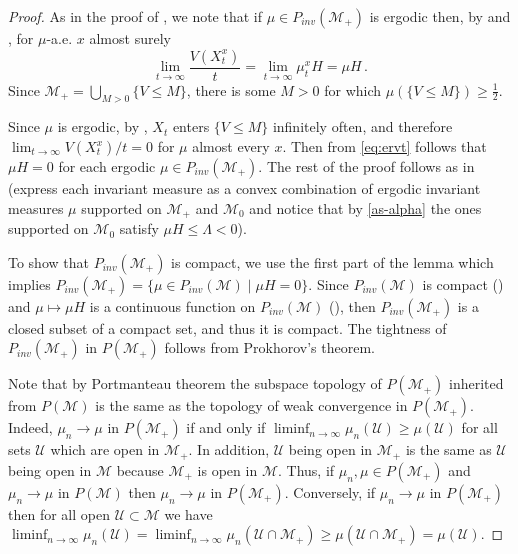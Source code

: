 \documentclass[final]{amsart}
\numberwithin{thm}{section}
\numberwithin{equation}{section}
\newcommand{\U}{\mathcal{U}}
\newcommand{\mcM}{\mathcal{M}}
\newcommand{\inv}{\mathcal{M}_+}
\begin{document}
\begin{proof}
    As in the proof of \cite[Proposition 4.6i]{persistence}, we note that if $\mu \in P_{inv}(\inv)$ is ergodic then, by  and , for $\mu$-a.e. $x$ almost surely 
    \begin{equation}\label{eq:ervt}
        \lim_{t \to \infty} \frac{V(X_t^x)}{t} = \lim_{t \to \infty} \mu_t^x H = \mu H \,.
    \end{equation}
    Since $\inv = \bigcup_{M > 0} \{V \leq M\}$, there is some $M > 0$ for which $\mu(\{V \leq M\}) \geq \frac{1}{2}$.


Since $\mu$ is ergodic,     
 by ,  $X_t$  enters $\{V \leq M\}$ infinitely often, and therefore $\lim_{t \to \infty} V(X_t^x)/t = 0$ for $\mu$ almost every $x$. Then from \eqref{eq:ervt} follows that 
 $\mu H = 0$ for each ergodic $\mu \in P_{inv}(\inv)$. The rest of the proof follows as in \cite[Proposition 4.6i]{persistence} (express each invariant measure as a convex combination of ergodic invariant measures $\mu$ supported on $\inv$ and $\mcM_0$ and notice that by \ref{as-alpha} the ones supported on $\mcM_0$ satisfy $\mu H \leq \Lambda < 0$).
 

 To show that $P_{inv}(\inv)$ is compact, we use the first part of the lemma which implies $P_{inv}(\inv) = \{\mu \in P_{inv}(\mcM) \mid \mu H = 0\}$. Since $P_{inv}(\mcM)$ is compact () and $\mu \mapsto \mu H$ is a continuous function on $P_{inv}(\mcM)$ (), then $P_{inv}(\inv)$ is a closed subset of a compact set, and thus it is compact. The tightness of $P_{inv}(\inv)$ in $P(\inv)$ follows from Prokhorov's theorem. 
 
 Note that by Portmanteau theorem the subspace topology of $P(\inv)$ inherited from $P(\mcM)$ is the same as the topology of weak convergence in $P(\inv)$. Indeed, $\mu_n \to \mu$ in $P(\inv)$ if and only if $\liminf_{n \to \infty} \mu_n(\U) \geq \mu(\U)$ for all sets $\U$ which are open in $\inv$. In addition, $\U$ being open in $\inv$ is the same as $\U$ being open in $\mcM$ because $\inv$ is open in $\mcM$. Thus, if $\mu_n, \mu \in P(\inv)$ and $\mu_n \to \mu$ in $P(\mcM)$ then $\mu_n \to \mu$ in $P(\inv)$. Conversely, if $\mu_n \to \mu$ in $P(\inv)$ then for all open $\U \subset \mcM$ we have $\liminf_{n \to \infty} \mu_n(\U) = \liminf_{n \to \infty} \mu_n(\U \cap \inv) \geq \mu(\U \cap \inv) = \mu(\U)$.
 
 
\end{proof}
\end{document}
